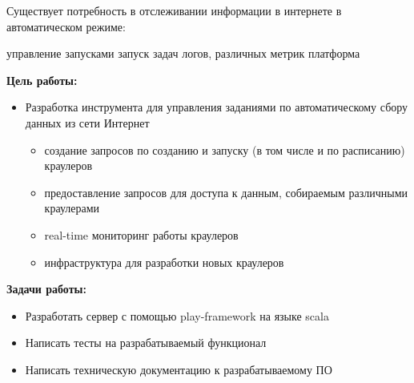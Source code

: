 

Существует потребность в отслеживании информации в интернете в автоматическом режиме:
\begin{itemize}
 управление запусками
 запуск задач
 логов, различных метрик
 платформа
\end{itemize}

\textbf{Цель работы:}

    \begin{itemize}
        \item Разработка инструмента для управления заданиями по автоматическому сбору данных из сети Интернет
        \begin{itemize}
            \item создание запросов по созданию и запуску (в том числе и по расписанию)  краулеров
            \item предоставление запросов для доступа к данным, собираемым различными краулерами
            \item real-time мониторинг работы краулеров
            \item инфраструктура для разработки новых краулеров
        \end{itemize}
    \end{itemize}
    
\textbf{Задачи работы:}
    \begin{itemize}
        \item Разработать сервер с помощью play-framework на языке scala 
        \item Написать тесты на разрабатываемый функционал
        \item Написать техническую документацию к разрабатываемому ПО
    \end{itemize}


